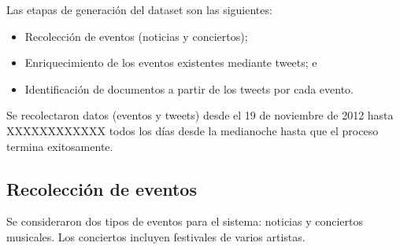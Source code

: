 \documentclass[upright, contnum]{umemoria}
\begin{document}
Las etapas de generación del dataset son las siguientes:

\begin{itemize}
\item Recolección de eventos (noticias y conciertos);
\item Enriquecimiento de los eventos existentes mediante tweets; e
\item Identificación de documentos a partir de los tweets por cada evento.
\end{itemize}
Se recolectaron datos (eventos y tweets) desde el 19 de noviembre de
2012 hasta XXXXXXXXXXXX todos los días desde la medianoche hasta que
el proceso termina exitosamente.

\subsection{Recolección de eventos}
\label{sec-4.3.1}


Se consideraron dos tipos de eventos para el sistema: noticias y
conciertos musicales. Los conciertos incluyen festivales de varios
artistas.
\end{document}
